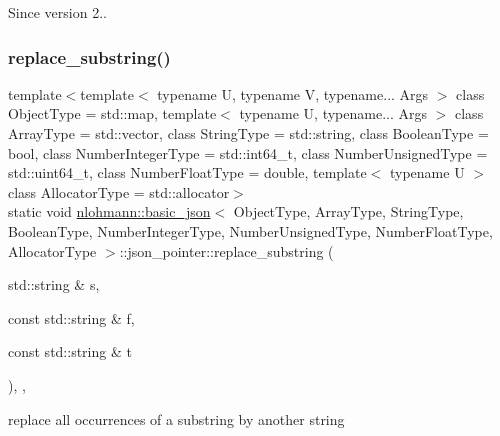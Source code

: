 \begin{DoxySince}{Since}
version 2.. 
\end{DoxySince}
\hypertarget{classnlohmann_1_1basic__json_1_1json__pointer_a414bce1ecc972c4f036f6edd021c70cf}{}\label{classnlohmann_1_1basic__json_1_1json__pointer_a414bce1ecc972c4f036f6edd021c70cf} 
\subsubsection{\texorpdfstring{replace\+\_\+substring()}{replace\_substring()}}
{\footnotesize\ttfamily template$<$template$<$ typename U, typename V, typename... Args $>$ class Object\+Type = std\+::map, template$<$ typename U, typename... Args $>$ class Array\+Type = std\+::vector, class String\+Type  = std\+::string, class Boolean\+Type  = bool, class Number\+Integer\+Type  = std\+::int64\+\_\+t, class Number\+Unsigned\+Type  = std\+::uint64\+\_\+t, class Number\+Float\+Type  = double, template$<$ typename U $>$ class Allocator\+Type = std\+::allocator$>$ \\
static void \hyperlink{classnlohmann_1_1basic__json}{nlohmann\+::basic\+\_\+json}$<$ Object\+Type, Array\+Type, String\+Type, Boolean\+Type, Number\+Integer\+Type, Number\+Unsigned\+Type, Number\+Float\+Type, Allocator\+Type $>$\+::json\+\_\+pointer\+::replace\+\_\+substring (\begin{DoxyParamCaption}\item[{std\+::string \&}]{s,  }\item[{const std\+::string \&}]{f,  }\item[{const std\+::string \&}]{t }\end{DoxyParamCaption})\hspace{0.3cm}{\ttfamily [inline]}, {\ttfamily [static]}, {\ttfamily [private]}}



replace all occurrences of a substring by another string 


